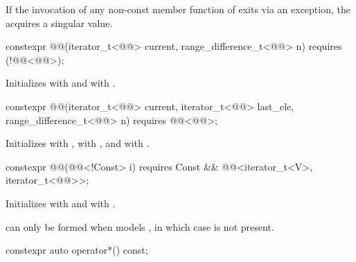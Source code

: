 \pnum
If the invocation of any non-const member function of 
exits via an exception, the  acquires a singular value.

%
\begin{itemdecl}
constexpr @@(iterator_t<@@> current, range_difference_t<@@> n)
  requires (!@@<@@>);
\end{itemdecl}

\begin{itemdescr}
\pnum
\effects
Initializes  with  and
 with .
\end{itemdescr}

%
\begin{itemdecl}
constexpr @@(iterator_t<@@> current, iterator_t<@@> last_ele,
                   range_difference_t<@@> n)
  requires @@<@@>;
\end{itemdecl}

\begin{itemdescr}
\pnum
\effects
Initializes  with ,
 with , and
 with .
\end{itemdescr}

%
\begin{itemdecl}
constexpr @@(@@<!Const> i)
  requires Const && @@<iterator_t<V>, iterator_t<@@>>;
\end{itemdecl}

\begin{itemdescr}
\pnum
\effects
Initializes  with  and
 with .
\begin{note}
 can only be formed
when  models ,
in which case  is not present.
\end{note}
\end{itemdescr}

%
\begin{itemdecl}
constexpr auto operator*() const;
\end{itemdecl}

